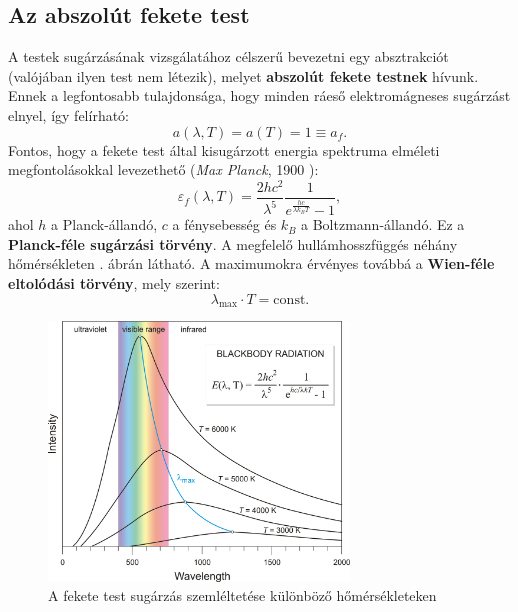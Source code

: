 \documentclass[a4paper, 12pt]{article}
\begin{document}
    \subsection{Az abszolút fekete test}\label{subsec:az-abszolut-fekete-test}
    A testek sugárzásának vizsgálatához célszerű bevezetni egy absztrakciót (valójában ilyen test nem létezik), melyet \textbf{abszolút fekete testnek} hívunk.
    Ennek a legfontosabb tulajdonsága, hogy minden ráeső elektromágneses sugárzást elnyel, így felírható:
    \begin{equation}
        a(\lambda, T)=a(T)=1\equiv a_f.
    \end{equation}
    Fontos, hogy a fekete test által kisugárzott energia spektruma elméleti megfontolásokkal levezethető (\textit{Max Planck}, 1900 \cite{planck}):
    \begin{equation}
        \varepsilon_f(\lambda, T)=\frac{2hc^2}{\lambda^5}\frac{1}{e^{\frac{hc}{\lambda k_BT}}-1},
    \end{equation}
    ahol $h$ a Planck-állandó, $c$ a fénysebesség és $k_B$ a Boltzmann-állandó. Ez a \textbf{Planck-féle sugárzási törvény}.
    A megfelelő hullámhosszfüggés néhány hőmérsékleten . ábrán látható. A maximumokra érvényes továbbá a \textbf{Wien-féle eltolódási törvény}, mely szerint:
    \begin{equation}
        \lambda_{\mathrm{max}}\cdot T=\mathrm{const}.
    \end{equation}
    \begin{figure}[H]
        \centering
        \includegraphics[width=8cm]{blackbody_radiation}
        \caption{A fekete test sugárzás szemléltetése különböző hőmérsékleteken \cite{rad}}
        \label{fig:0blackrad}
    \end{figure}
\end{document}
